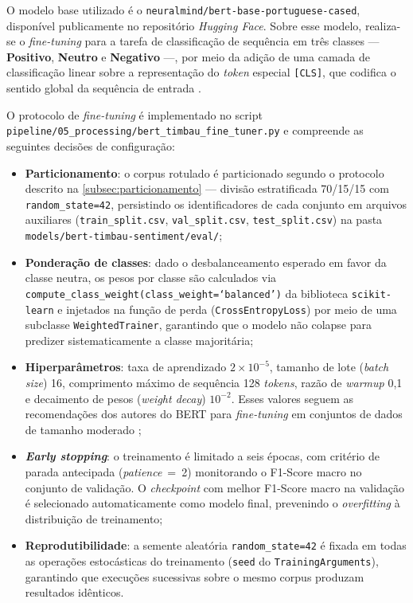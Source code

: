 O modelo base utilizado é o \texttt{neuralmind/bert-base-portuguese-cased}, disponível publicamente no repositório \textit{Hugging Face}. Sobre esse modelo, realiza-se o \textit{fine-tuning} para a tarefa de classificação de sequência em três classes --- \textbf{Positivo}, \textbf{Neutro} e \textbf{Negativo} ---, por meio da adição de uma camada de classificação linear sobre a representação do \textit{token} especial \texttt{[CLS]}, que codifica o sentido global da sequência de entrada \cite{devlin2019}.

O protocolo de \textit{fine-tuning} é implementado no script \texttt{pipeline/05\_processing/bert\_timbau\_fine\_tuner.py} e compreende as seguintes decisões de configuração:

\begin{itemize}
	\item \textbf{Particionamento}: o corpus rotulado é particionado segundo o protocolo descrito na \autoref{subsec:particionamento} --- divisão estratificada 70/15/15 com \texttt{random\_state=42}, persistindo os identificadores de cada conjunto em arquivos auxiliares (\texttt{train\_split.csv}, \texttt{val\_split.csv}, \texttt{test\_split.csv}) na pasta \texttt{models/bert-timbau-sentiment/eval/};
	
	\item \textbf{Ponderação de classes}: dado o desbalanceamento esperado em favor da classe neutra, os pesos por classe são calculados via \texttt{compute\_class\_weight(class\_weight=`balanced')} da biblioteca \texttt{scikit-learn} e injetados na função de perda (\texttt{CrossEntropyLoss}) por meio de uma subclasse \texttt{WeightedTrainer}, garantindo que o modelo não colapse para predizer sistematicamente a classe majoritária;
	
	\item \textbf{Hiperparâmetros}: taxa de aprendizado $2 \times 10^{-5}$, tamanho de lote (\textit{batch size}) 16, comprimento máximo de sequência 128 \textit{tokens}, razão de \textit{warmup} 0,1 e decaimento de pesos (\textit{weight decay}) $10^{-2}$. Esses valores seguem as recomendações dos autores do BERT para \textit{fine-tuning} em conjuntos de dados de tamanho moderado \cite{devlin2019};
	
	\item \textbf{\textit{Early stopping}}: o treinamento é limitado a seis épocas, com critério de parada antecipada (\textit{patience}~=~2) monitorando o F1-Score macro no conjunto de validação. O \textit{checkpoint} com melhor F1-Score macro na validação é selecionado automaticamente como modelo final, prevenindo o \textit{overfitting} à distribuição de treinamento;
	
	\item \textbf{Reprodutibilidade}: a semente aleatória \texttt{random\_state=42} é fixada em todas as operações estocásticas do treinamento (\texttt{seed} do \texttt{TrainingArguments}), garantindo que execuções sucessivas sobre o mesmo corpus produzam resultados idênticos.
\end{itemize}

